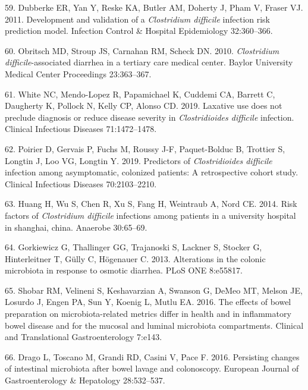 \documentclass[
  11pt,
]{article}
\begin{document}
\leavevmode\hypertarget{ref-Dubberke2011}{}%
59. Dubberke ER, Yan Y, Reske KA, Butler AM, Doherty J, Pham V, Fraser
VJ. 2011. Development and validation of a \emph{Clostridium difficile}
infection risk prediction model. Infection Control \& Hospital
Epidemiology 32:360--366.

\leavevmode\hypertarget{ref-Obritsch2010}{}%
60. Obritsch MD, Stroup JS, Carnahan RM, Scheck DN. 2010.
\emph{Clostridium difficile}-associated diarrhea in a tertiary care
medical center. Baylor University Medical Center Proceedings
23:363--367.

\leavevmode\hypertarget{ref-White2019}{}%
61. White NC, Mendo-Lopez R, Papamichael K, Cuddemi CA, Barrett C,
Daugherty K, Pollock N, Kelly CP, Alonso CD. 2019. Laxative use does not
preclude diagnosis or reduce disease severity in \emph{Clostridioides
difficile} infection. Clinical Infectious Diseases 71:1472--1478.

\leavevmode\hypertarget{ref-Poirier2019}{}%
62. Poirier D, Gervais P, Fuchs M, Roussy J-F, Paquet-Bolduc B, Trottier
S, Longtin J, Loo VG, Longtin Y. 2019. Predictors of
\emph{Clostridioides difficile} infection among asymptomatic, colonized
patients: A retrospective cohort study. Clinical Infectious Diseases
70:2103--2210.

\leavevmode\hypertarget{ref-Huang2014}{}%
63. Huang H, Wu S, Chen R, Xu S, Fang H, Weintraub A, Nord CE. 2014.
Risk factors of \emph{Clostridium difficile} infections among patients
in a university hospital in shanghai, china. Anaerobe 30:65--69.

\leavevmode\hypertarget{ref-Gorkiewicz2013}{}%
64. Gorkiewicz G, Thallinger GG, Trajanoski S, Lackner S, Stocker G,
Hinterleitner T, Gülly C, Högenauer C. 2013. Alterations in the colonic
microbiota in response to osmotic diarrhea. PLoS ONE 8:e55817.

\leavevmode\hypertarget{ref-Shobar2016}{}%
65. Shobar RM, Velineni S, Keshavarzian A, Swanson G, DeMeo MT, Melson
JE, Losurdo J, Engen PA, Sun Y, Koenig L, Mutlu EA. 2016. The effects of
bowel preparation on microbiota-related metrics differ in health and in
inflammatory bowel disease and for the mucosal and luminal microbiota
compartments. Clinical and Translational Gastroenterology 7:e143.

\leavevmode\hypertarget{ref-Drago2016}{}%
66. Drago L, Toscano M, Grandi RD, Casini V, Pace F. 2016. Persisting
changes of intestinal microbiota after bowel lavage and colonoscopy.
European Journal of Gastroenterology \& Hepatology 28:532--537.
\end{document}
